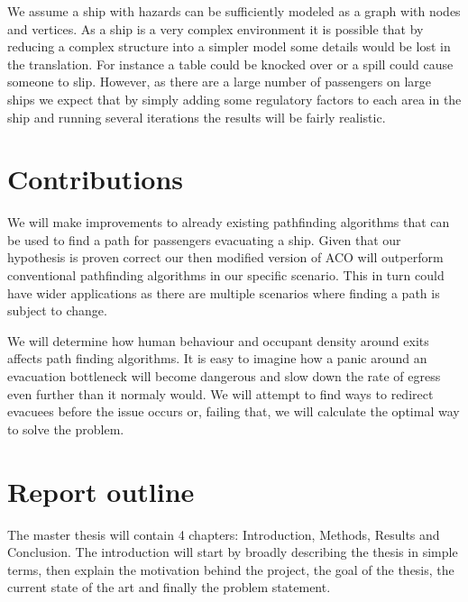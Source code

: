 We assume a ship with hazards can be sufficiently modeled as a graph with nodes and vertices. As a ship is a very complex
environment it is possible that by reducing a complex structure into a simpler model some details would be lost in the
translation. For instance a table could be knocked over or a spill could cause someone to slip. However, as there are a large number of 
passengers on large ships we expect that by simply adding some regulatory factors to each area in the ship and running
several iterations the results will be fairly realistic.                                                                                                                               %

\section{Contributions}

 We will make improvements to already existing pathfinding algorithms that can be used to find a path 
for passengers evacuating a ship. Given that our hypothesis is proven
correct our then modified version of ACO will outperform conventional pathfinding algorithms in our 
specific scenario. This in turn could have wider applications as there are multiple scenarios
where finding a path is subject to change. 

We will determine how human behaviour and occupant density around exits affects path finding algorithms.
It is easy to imagine how a panic around an evacuation bottleneck will become dangerous and slow
down the rate of egress even further than it normaly would. We will attempt to find ways to redirect
evacuees before the issue occurs or, failing that, we will calculate the optimal way to solve the problem.


\section{Report outline}

The master thesis will contain 4 chapters: Introduction, Methods, Results and Conclusion.
The introduction will start by broadly describing the thesis in simple terms, then explain the motivation behind the project,
the goal of the thesis, the current state of the art and finally the problem statement. 


